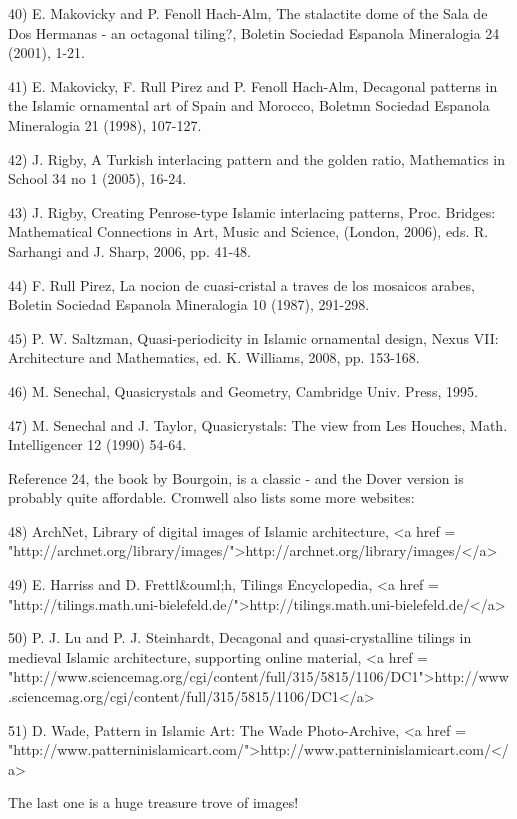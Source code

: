 40) E. Makovicky and P. Fenoll Hach-Alm, The stalactite dome of the
Sala de Dos Hermanas - an octagonal tiling?, Boletin Sociedad Espanola
Mineralogia 24 (2001), 1-21.
 
41) E. Makovicky, F. Rull Pirez and P. Fenoll Hach-Alm, Decagonal 
patterns in the Islamic ornamental art of Spain and Morocco, Boletmn 
Sociedad Espanola Mineralogia 21 (1998), 107-127.
 
42) J. Rigby, A Turkish interlacing pattern and the golden ratio, 
Mathematics in School 34 no 1 (2005), 16-24.
 
43) J. Rigby, Creating Penrose-type Islamic interlacing patterns, 
Proc. Bridges: Mathematical Connections in Art, Music and Science, 
(London, 2006), eds. R. Sarhangi and J. Sharp, 2006, pp. 41-48.
 
44) F. Rull Pirez, La nocion de cuasi-cristal a traves de los mosaicos 
arabes, Boletin Sociedad Espanola Mineralogia 10 (1987), 291-298.
 
45) P. W. Saltzman, Quasi-periodicity in Islamic ornamental design, 
Nexus VII: Architecture and Mathematics, ed. K. Williams, 2008, pp. 
153-168.
 
46) M. Senechal, Quasicrystals and Geometry, Cambridge Univ. Press, 
1995.
 
47) M. Senechal and J. Taylor, Quasicrystals: The view from Les 
Houches, Math. Intelligencer 12 (1990) 54-64.
 
Reference 24, the book by Bourgoin, is a classic - and the Dover version
is probably quite affordable.  Cromwell also lists some more websites:

48) ArchNet, Library of digital images of Islamic architecture, 
<a href = "http://archnet.org/library/images/">http://archnet.org/library/images/</a>
 
49) E. Harriss and D. Frettl&ouml;h, Tilings Encyclopedia, 
<a href = "http://tilings.math.uni-bielefeld.de/">http://tilings.math.uni-bielefeld.de/</a>
 
50) P. J. Lu and P. J. Steinhardt, Decagonal and quasi-crystalline
tilings in medieval Islamic architecture, supporting online material,
<a href =
"http://www.sciencemag.org/cgi/content/full/315/5815/1106/DC1">http://www.sciencemag.org/cgi/content/full/315/5815/1106/DC1</a>
 
51) D. Wade, Pattern in Islamic Art: The Wade Photo-Archive, 
<a href = "http://www.patterninislamicart.com/">http://www.patterninislamicart.com/</a>

The last one is a huge treasure trove of images!

